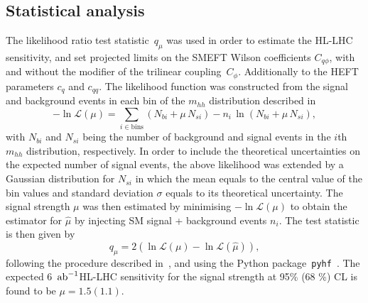 \subsection{Statistical analysis}
The likelihood ratio test statistic~$q_\mu$ was used  in order to estimate the HL-LHC sensitivity, and set projected limits on the SMEFT Wilson coefficients $C_{q\phi}$, with and without the modifier of the trilinear coupling~$C_\phi$. Additionally to the HEFT parameters $c_q$ and $c_{qq}$. The likelihood function was constructed from the signal and background events in each bin of the $m_{hh}$ distribution described in ~\cite{Azatov:2015oxa} 
\begin{equation} \label{loglik}
	- \ln \mathscr L (\mu) = \sum_{i \in \mathrm{bins}} (N_{bi} + \mu\, N_{si}) - n_i\, \ln(N_{bi} + \mu\, N_{si}),
\end{equation}
with  $N_{bi}$ and $N_{si}$ being the number of background  and signal events in the $i$th $ m_{hh}$ distribution, respectively. In order to include the theoretical uncertainties on the expected number of signal events, the above likelihood was extended by a Gaussian distribution for $N_{si}$ in which the mean equals to the central value of the bin values and standard deviation $\sigma$ equals to its theoretical uncertainty.
The signal strength $ \mu$ was then estimated by minimising $- \ln \mathscr L (\mu)$ to obtain the estimator for $\hat \mu$ by injecting SM signal + background events $n_i$. The test statistic is then given by
\begin{equation}
	q_\mu = 2 (\ln \mathscr L (\mu)- \ln \mathscr L ( \hat \mu) ),
\end{equation}
following the procedure described in~\cite{Cowan:2010js}, and using the Python package~\texttt{pyhf}~\cite{pyhf,pyhf_joss}.
The expected  6 $\,{\rm ab}^{-1}$HL-LHC sensitivity for the signal strength  at 95\% (68 \%) CL is found to be $\mu  = 1.5 (1.1)$.
